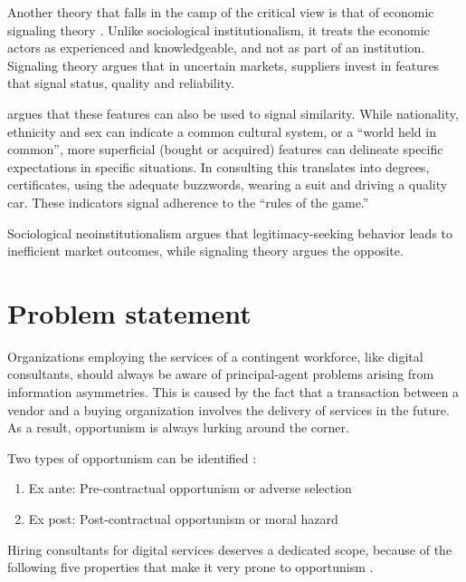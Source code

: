 \documentclass[12pt]{article}
\providecommand{\tightlist}{%
  \setlength{\itemsep}{0pt}\setlength{\parskip}{0pt}}
\begin{document}
Another theory that falls in the camp of the critical view is that of
economic signaling theory \citep[ 8-10]{armbruster2006}. Unlike
sociological institutionalism, it treats the economic actors as
experienced and knowledgeable, and not as part of an institution.
Signaling theory argues that in uncertain markets, suppliers invest in
features that signal status, quality and reliability.

\citet[15-16]{zucker1985} argues that these features can also be used to
signal similarity. While nationality, ethnicity and sex can indicate a
common cultural system, or a ``world held in common'', more superficial
(bought or acquired) features can delineate specific expectations in
specific situations. In consulting this translates into degrees,
certificates, using the adequate buzzwords, wearing a suit and driving a
quality car. These indicators signal adherence to the ``rules of the
game.''

Sociological neoinstitutionalism argues that legitimacy-seeking behavior
leads to inefficient market outcomes, while signaling theory argues the
opposite.

\hypertarget{problem-statement}{%
\section{Problem statement}\label{problem-statement}}

Organizations employing the services of a contingent workforce, like
digital consultants, should always be aware of principal-agent problems
arising from information asymmetries. This is caused by the fact that a
transaction between a vendor and a buying organization involves the
delivery of services in the future. As a result, opportunism is always
lurking around the corner.

Two types of opportunism can be identified \citet[242]{clark1993}:

\begin{enumerate}
\def\labelenumi{\arabic{enumi}.}
\tightlist
\item
  Ex ante: Pre-contractual opportunism or adverse selection
\item
  Ex post: Post-contractual opportunism or moral hazard
\end{enumerate}

Hiring consultants for digital services deserves a dedicated scope,
because of the following five properties that make it very prone to
opportunism \citep[ 207]{leslie1995}.
\end{document}

